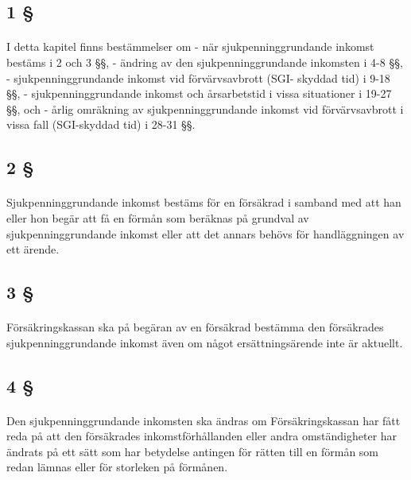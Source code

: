 \documentclass[a4paper,notitlepage,openany,10pt]{book}
\begin{document}
\subsection*{1 §}
\paragraph*{}
I detta kapitel finns bestämmelser om
\newline - när sjukpenninggrundande inkomst bestäms i 2 och 3 §§,
\newline - ändring av den sjukpenninggrundande inkomsten i 4-8 §§,
\newline - sjukpenninggrundande inkomst vid förvärvsavbrott (SGI- skyddad tid) i 9-18 §§,
\newline - sjukpenninggrundande inkomst och årsarbetstid i vissa situationer i 19-27 §§, och
\newline - årlig omräkning av sjukpenninggrundande inkomst vid förvärvsavbrott i vissa fall (SGI-skyddad tid) i 28-31 §§.
\subsection*{2 §}
\paragraph*{}
Sjukpenninggrundande inkomst bestäms för en försäkrad i samband med att han eller hon begär att få en förmån som beräknas på grundval av sjukpenninggrundande inkomst eller att det annars behövs för handläggningen av ett ärende.
\subsection*{3 §}
\paragraph*{}
Försäkringskassan ska på begäran av en försäkrad bestämma den försäkrades sjukpenninggrundande inkomst även om något ersättningsärende inte är aktuellt.
\subsection*{4 §}
\paragraph*{}
Den sjukpenninggrundande inkomsten ska ändras om Försäkringskassan har fått reda på att den försäkrades inkomstförhållanden eller andra omständigheter har ändrats på ett sätt som har betydelse antingen för rätten till en förmån som redan lämnas eller för storleken på förmånen.
\end{document}
